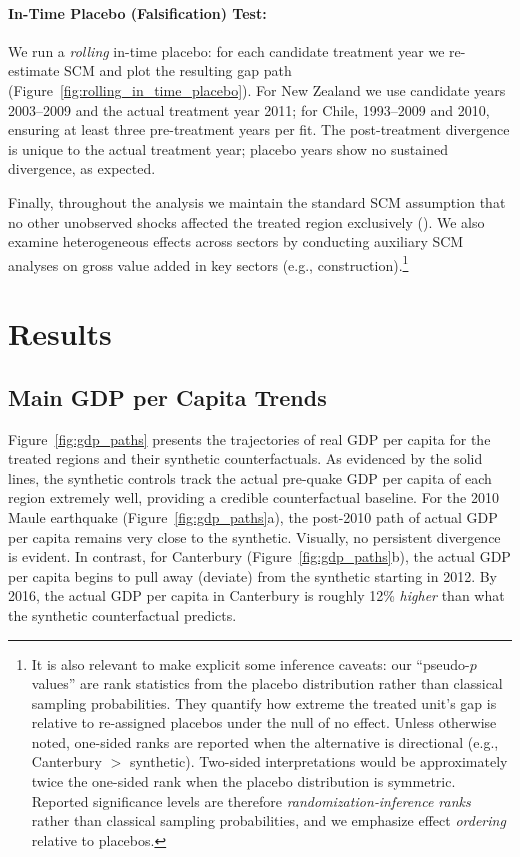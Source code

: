\documentclass[12pt]{article}
\begin{document}
\paragraph{In-Time Placebo (Falsification) Test:} We run a \emph{rolling} in-time placebo: for each candidate treatment year we re-estimate SCM and plot the resulting gap path (Figure~\ref{fig:rolling_in_time_placebo}). For New Zealand we use candidate years 2003--2009 and the actual treatment year 2011; for Chile, 1993--2009 and 2010, ensuring at least three pre-treatment years per fit. The post-treatment divergence is unique to the actual treatment year; placebo years show no sustained divergence, as expected.


Finally, throughout the analysis we maintain the standard SCM assumption that no other unobserved shocks affected the treated region exclusively (\cite{abadie2010synthetic, abadie2003economic}). We also examine heterogeneous effects across sectors by conducting auxiliary SCM analyses on gross value added in key sectors (e.g., construction).\footnote{It is also relevant to make explicit some inference caveats: our “pseudo-$p$ values” are rank statistics from the placebo distribution rather than classical sampling probabilities. They quantify how extreme the treated unit’s gap is relative to re-assigned placebos under the null of no effect. Unless otherwise noted, one-sided ranks are reported when the alternative is directional (e.g., Canterbury $>$ synthetic). Two-sided interpretations would be approximately twice the one-sided rank when the placebo distribution is symmetric. Reported significance levels are therefore \emph{randomization‑inference ranks} rather than classical sampling probabilities, and we emphasize effect \emph{ordering} relative to placebos.}

\section{Results}
\subsection{Main GDP per Capita Trends}
Figure \ref{fig:gdp_paths} presents the trajectories of real GDP per capita for the treated regions and their synthetic counterfactuals. As evidenced by the solid lines, the synthetic controls track the actual pre-quake GDP per capita of each region extremely well, providing a credible counterfactual baseline. For the 2010 Maule earthquake (Figure \ref{fig:gdp_paths}a), the post-2010 path of actual GDP per capita remains very close to the synthetic. Visually, no persistent divergence is evident. In contrast, for Canterbury (Figure \ref{fig:gdp_paths}b), the actual GDP per capita begins to pull away (deviate) from the synthetic starting in 2012. By 2016, the actual GDP per capita in Canterbury is roughly 12\% \textit{higher} than what the synthetic counterfactual predicts.
\end{document}
